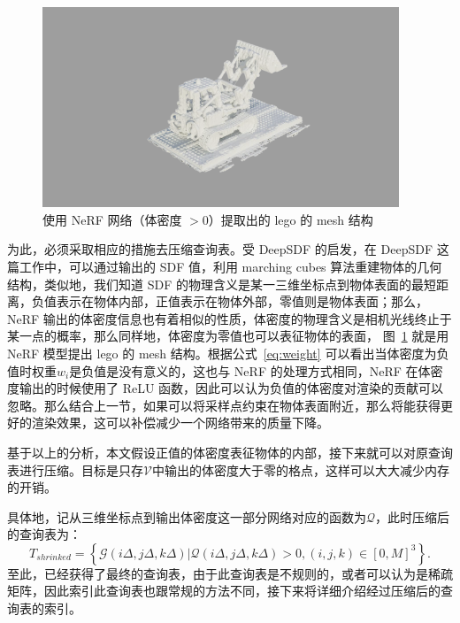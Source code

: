\begin{figure}[b]
    \centering
    \includegraphics[width=0.95\textwidth]{figures/legomesh_gray_complete.png}
    \caption{使用 NeRF 网络（体密度 $> 0$）提取出的 lego 的 mesh 结构}
    \label{fig:lego_mesh}
\end{figure}

为此，必须采取相应的措施去压缩查询表。受 DeepSDF \cite{park2019deepsdf}的启发，在 DeepSDF 这篇工作中，可以通过输出的 SDF 值，利用 marching cubes 算法\cite{lorensen1987marching}重建物体的几何结构，类似地，我们知道 SDF 的物理含义是某一三维坐标点到物体表面的最短距离，负值表示在物体内部，正值表示在物体外部，零值则是物体表面；那么，NeRF 输出的体密度信息也有着相似的性质，体密度的物理含义是相机光线终止于某一点的概率，那么同样地，体密度为零值也可以表征物体的表面， 图~\ref{fig:lego_mesh} 就是用 NeRF 模型提出 lego 的 mesh 结构。根据公式~\ref{eq:weight} 可以看出当体密度为负值时权重$w_i$是负值是没有意义的，这也与 NeRF 的处理方式相同，NeRF 在体密度输出的时候使用了 ReLU 函数，因此可以认为负值的体密度对渲染的贡献可以忽略。那么结合上一节，如果可以将采样点约束在物体表面附近，那么将能获得更好的渲染效果，这可以补偿减少一个网络带来的质量下降。

基于以上的分析，本文假设正值的体密度表征物体的内部，接下来就可以对原查询表进行压缩。目标是只存$\mathcal{V}$中输出的体密度大于零的格点，这样可以大大减少内存的开销。

具体地，记从三维坐标点到输出体密度这一部分网络对应的函数为$\mathcal{Q}$，此时压缩后的查询表为：
\begin{equation}
    T_{shrinked} = \left\{
    \mathcal{G}\left(i\Delta, j\Delta, k\Delta\right) | \mathcal{Q}\left(i\Delta, j\Delta, k\Delta \right)  > 0, \left(i, j, k\right) \in \left[0, M\right]^3 
    \right\}.
\end{equation}
至此，已经获得了最终的查询表，由于此查询表是不规则的，或者可以认为是稀疏矩阵，因此索引此查询表也跟常规的方法不同，接下来将详细介绍经过压缩后的查询表的索引。

